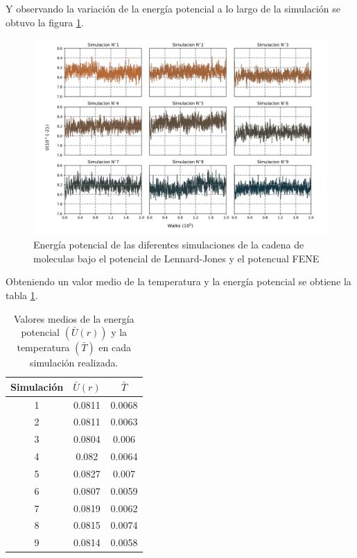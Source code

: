 Y observando la variación de la energía potencial a lo largo de la simulación se obtuvo la figura \ref{fig:energy}.
\begin{figure}[H]
    \includegraphics[scale=0.25]{../Graphics/energy.png}
    \caption{Energía potencial de las diferentes simulaciones de la cadena de moleculas bajo el potencial de Lennard-Jones y el potencual FENE}
    \label{fig:energy}
\end{figure}
Obteniendo un valor medio de la temperatura y la energía potencial se obtiene la tabla \ref{table:mean}.
\begin{table}[H]
    \centering
    \begin{tabular}{ccc} \hline
        Simulación & $\bar{U}(r)$ & $\bar{T}$ \\ \hline
        1&0.0811&0.0068\\
        2&0.0811&0.0063\\
        3&0.0804&0.006\\
        4&0.082&0.0064\\
        5&0.0827&0.007\\
        6&0.0807&0.0059\\
        7&0.0819&0.0062\\
        8&0.0815&0.0074\\
        9&0.0814&0.0058\\ \hline
    \end{tabular}
    \caption{Valores medios de la energía potencial $(\bar{U}(r))$ y la temperatura $(\bar{T})$ en cada simulación realizada.}
    \label{table:mean}
\end{table}